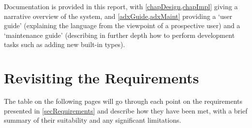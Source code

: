 \documentclass[11pt]{report}
\begin{document}
Documentation is provided in this report, with \cref{chapDesign,chapImpl} giving a narrative overview of the system, and \cref{adxGuide,adxMaint} providing a `user guide' (explaining the language from the viewpoint of a prospective user) and a `maintenance guide' (describing in further depth how to perform development tasks such as adding new built-in types).

\section{Revisiting the Requirements} \label{secReqsRetro}

The table on the following pages will go through each point on the requirements presented in \cref{secRequirements} and describe how they have been met, with a brief summary of their suitability and any significant limitations.
\end{document}
